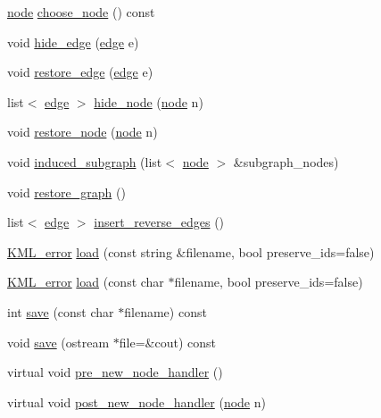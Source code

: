 \begin{DoxyCompactItemize}
\item 
\mbox{\hyperlink{classnode}{node}} \mbox{\hyperlink{classgraph_aec5c11c90a94ebd145f059a541db860e}{choose\+\_\+node}} () const
\item 
void \mbox{\hyperlink{classgraph_ab2f8520bcac080d73c55228fecc61825}{hide\+\_\+edge}} (\mbox{\hyperlink{classedge}{edge}} e)
\item 
void \mbox{\hyperlink{classgraph_a2e5426682a0897b9f9104b019970bedc}{restore\+\_\+edge}} (\mbox{\hyperlink{classedge}{edge}} e)
\item 
list$<$ \mbox{\hyperlink{classedge}{edge}} $>$ \mbox{\hyperlink{classgraph_a4f0177ffe8eaddd9c5bec73078bed873}{hide\+\_\+node}} (\mbox{\hyperlink{classnode}{node}} n)
\item 
void \mbox{\hyperlink{classgraph_ab57aab79e649cc275052b7decbdd03ec}{restore\+\_\+node}} (\mbox{\hyperlink{classnode}{node}} n)
\item 
void \mbox{\hyperlink{classgraph_ad185dbb16a66777632eb13eec3c54244}{induced\+\_\+subgraph}} (list$<$ \mbox{\hyperlink{classnode}{node}} $>$ \&subgraph\+\_\+nodes)
\item 
void \mbox{\hyperlink{classgraph_a53e2a5505fa6427587e12d66e4a86cec}{restore\+\_\+graph}} ()
\item 
list$<$ \mbox{\hyperlink{classedge}{edge}} $>$ \mbox{\hyperlink{classgraph_a14c2481f74ba9222732accddf01861bc}{insert\+\_\+reverse\+\_\+edges}} ()
\item 
\mbox{\hyperlink{struct_k_m_l__error}{K\+M\+L\+\_\+error}} \mbox{\hyperlink{classgraph_a35749ff66d1acd6bbef9852df4f39c95}{load}} (const string \&filename, bool preserve\+\_\+ids=false)
\item 
\mbox{\hyperlink{struct_k_m_l__error}{K\+M\+L\+\_\+error}} \mbox{\hyperlink{classgraph_a86fd7887c749213b5168d5eadd6228eb}{load}} (const char $\ast$filename, bool preserve\+\_\+ids=false)
\item 
int \mbox{\hyperlink{classgraph_a7bd0712a528249d1585085a64ac3e661}{save}} (const char $\ast$filename) const
\item 
void \mbox{\hyperlink{classgraph_a075a8a97c862b697c76682e35ceceb00}{save}} (ostream $\ast$file=\&cout) const
\item 
virtual void \mbox{\hyperlink{classgraph_afb7606eaa8d673b6599af24437c0546c}{pre\+\_\+new\+\_\+node\+\_\+handler}} ()
\item 
virtual void \mbox{\hyperlink{classgraph_a63b7354fbe3614748cc27340e99ff919}{post\+\_\+new\+\_\+node\+\_\+handler}} (\mbox{\hyperlink{classnode}{node}} n)
\item 

\end{DoxyCompactItemize}
